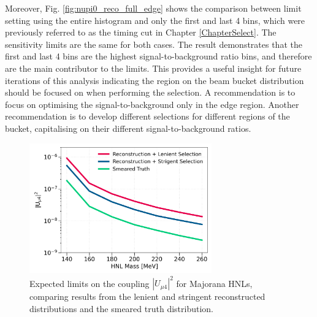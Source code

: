 Moreover, Fig. \ref{fig:nupi0_reco_full_edge} shows the comparison between limit setting using the entire histogram and only the first and last 4 bins, which were previously referred to as the timing cut in Chapter \ref{ChapterSelect}. 
The sensitivity limits are the same for both cases.
The result demonstrates that the first and last 4 bins are the highest signal-to-background ratio bins, and therefore are the main contributor to the limits.
This provides a useful insight for future iterations of this analysis indicating the region on the beam bucket distribution should be focused on when performing the selection.
A recommendation is to focus on optimising the signal-to-background only in the edge region.
Another recommendation is to develop different selections for different regions of the bucket, capitalising on their different signal-to-background ratios.

\begin{figure}[b!]
    \centering
    \includegraphics[width=0.7\textwidth]{sensitivity_strict_loose_truth}
    \caption{Expected limits on the coupling $|U_{\mu4}|^2$ for Majorana HNLs, comparing results from the lenient and stringent reconstructed distributions and the smeared truth distribution.}
    \label{fig:nupi0_reco_truth}
\end{figure}

